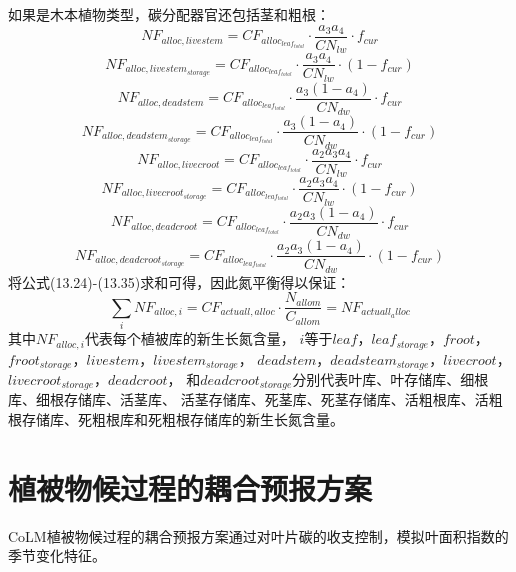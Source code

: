 如果是木本植物类型，碳分配器官还包括茎和粗根：
\begin{equation}
  NF_{alloc,livestem}=CF_{alloc_{leaf_{total}}}\cdot \frac{a_3a_4}{CN_{lw}}\cdot f_{cur}
\end{equation}
\begin{equation}
  NF_{alloc,livestem_{storage}}=CF_{alloc_{leaf_{total}}}\cdot \frac{a_3a_4}{CN_{lw}}\cdot \left(1-f_{cur}\right)
\end{equation}
\begin{equation}
  NF_{alloc,deadstem}=CF_{alloc_{leaf_{total}}}\cdot \frac{a_3\left(1-a_4\right)}{CN_{dw}}\cdot f_{cur}
\end{equation}
\begin{equation}
  NF_{alloc,deadstem_{storage}}=CF_{alloc_{leaf_{total}}}\cdot \frac{a_3\left(1-a_4\right)}{CN_{dw}}\cdot \left(1-f_{cur}\right)
\end{equation}
\begin{equation}
  NF_{alloc,livecroot}=CF_{alloc_{leaf_{total}}}\cdot \frac{a_2a_3a_4}{CN_{lw}}\cdot f_{cur}
\end{equation}
\begin{equation}
  NF_{alloc,livecroot_{storage}}=CF_{alloc_{leaf_{total}}}\cdot \frac{a_2a_3a_4}{CN_{lw}}\cdot \left(1-f_{cur}\right)
\end{equation}
\begin{equation}
  NF_{alloc,deadcroot}=CF_{alloc_{leaf_{total}}}\cdot \frac{a_2a_3\left(1-a_4\right)}{CN_{dw}}\cdot f_{cur}
\end{equation}
\begin{equation}
  NF_{alloc,deadcroot_{storage}}=CF_{alloc_{leaf_{total}}}\cdot \frac{a_2a_3\left(1-a_4\right)}{CN_{dw}}\cdot \left(1-f_{cur}\right)
\end{equation}
将公式(13.24)-(13.35)求和可得，因此氮平衡得以保证：
\begin{equation}
  \sum_{i}{NF_{alloc,i}}=CF_{actuall,alloc}\cdot \frac{N_{allom}}{C_{allom}}=NF_{actuall_alloc}
\end{equation}
其中$NF_{alloc,i}$代表每个植被库的新生长氮含量， 
$i$等于$leaf$，$leaf_{storage}$，$froot$，$froot_{storage}$，$livestem$，$livestem_{storage}$，
$deadstem$，$deadsteam_{storage}$，$livecroot$，$livecroot_{storage}$，$deadcroot$，
 和$deadcroot_{storage}$分别代表叶库、叶存储库、细根库、细根存储库、活茎库、
 活茎存储库、死茎库、死茎存储库、活粗根库、活粗根存储库、死粗根库和死粗根存储库的新生长氮含量。


\section{植被物候过程的耦合预报方案}\label{植被物候过程的耦合预报方案}
CoLM植被物候过程的耦合预报方案通过对叶片碳的收支控制，模拟叶面积指数的季节变化特征。


